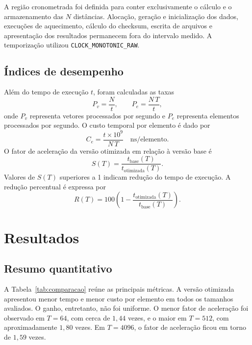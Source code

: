 \documentclass[11pt,a4paper]{article}
\begin{document}
A região cronometrada foi definida para conter exclusivamente o cálculo e o armazenamento das $N$ distâncias. Alocação, geração e inicialização dos dados, execuções de aquecimento, cálculo do checksum, escrita de arquivos e apresentação dos resultados permanecem fora do intervalo medido. A temporização utilizou \texttt{CLOCK\_MONOTONIC\_RAW}.

\subsection{Índices de desempenho}
Além do tempo de execução $t$, foram calculadas as taxas
\begin{equation}
P_v=\frac{N}{t},
\qquad
P_e=\frac{N\,T}{t},
\end{equation}
onde $P_v$ representa vetores processados por segundo e $P_e$ representa elementos processados por segundo. O custo temporal por elemento é dado por
\begin{equation}
C_e=\frac{t\times 10^9}{N\,T}\quad\text{ns/elemento}.
\end{equation}
O fator de aceleração da versão otimizada em relação à versão base é
\begin{equation}
S(T)=\frac{t_{\mathrm{base}}(T)}{t_{\mathrm{otimizada}}(T)}.
\end{equation}
Valores de $S(T)$ superiores a 1 indicam redução do tempo de execução. A redução percentual é expressa por
\begin{equation}
R(T)=100\left(1-\frac{t_{\mathrm{otimizada}}(T)}
{t_{\mathrm{base}}(T)}\right).
\end{equation}

\section{Resultados}

\subsection{Resumo quantitativo}
A Tabela~\ref{tab:comparacao} reúne as principais métricas. A versão otimizada apresentou menor tempo e menor custo por elemento em todos os tamanhos avaliados. O ganho, entretanto, não foi uniforme. O menor fator de aceleração foi observado em $T=64$, com cerca de $1{,}44$ vezes, e o maior em $T=512$, com aproximadamente $1{,}80$ vezes. Em $T=4096$, o fator de aceleração ficou em torno de $1{,}59$ vezes.
\end{document}
